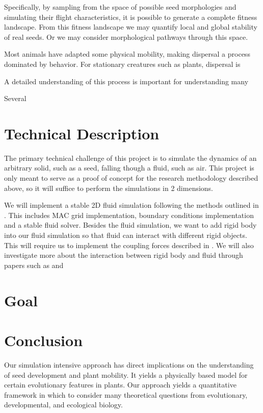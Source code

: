 \documentclass[annual]{acmsiggraph}
\begin{document}
 Specifically, by sampling from the space of possible seed morphologies and simulating their flight characteristics, it is possible to generate a complete fitness landscape.  From this fitness landscape we may quantify local and global stability of real seeds.  Or we may consider morphological pathways through this space.  
 
 

Most animals have adapted some physical mobility, making dispersal a process dominated by behavior.  For stationary creatures such as plants, dispersal is  


A detailed understanding of this process is important for understanding many 



\cite{wang2012}
\cite{levin1989}

Several 



\section{Technical Description}
The primary technical challenge of this project is to simulate the dynamics of an arbitrary solid, such as a seed, falling though a fluid, such as air.  This project is only meant to serve as a proof of concept for the research methodology described above, so it will suffice to perform the simulations in 2 dimensions.   

We will implement a stable 2D fluid simulation following the methods outlined in \cite{bridson2006}. This includes MAC grid implementation, boundary conditions implementation and a stable fluid solver. Besides the fluid simulation, we want to add rigid body into our fluid simulation so that fluid can interact with different rigid objects. This will require us to implement the coupling forces described in \cite{carlson2004}. We will also investigate more about the interaction between rigid body and fluid through papers such as \cite{guendelman2005} and \cite{baxter2004}



\section{Goal}

\section{Conclusion}

Our simulation intensive approach has direct implications on the understanding of seed development and plant mobility.  It yields a physically based model for certain evolutionary features in plants.   Our approach yields a quantitative framework in which to consider many theoretical questions from evolutionary, developmental, and ecological biology.  




\end{document}
